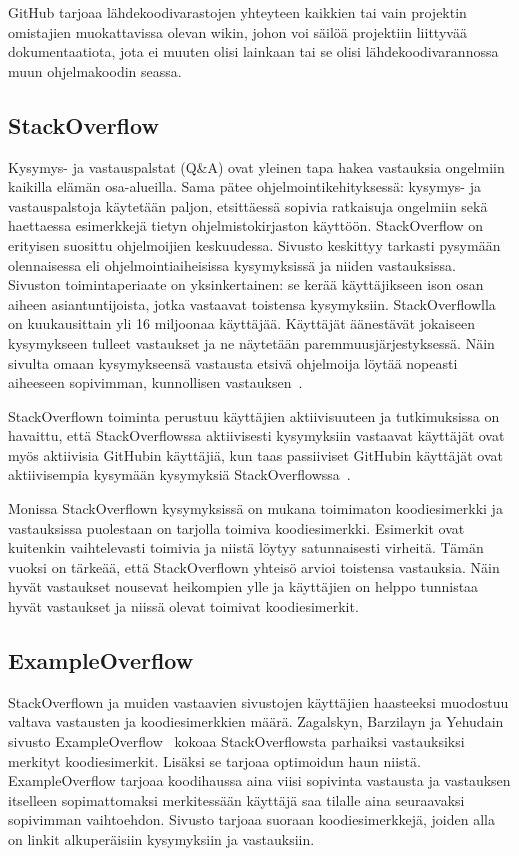 \documentclass[finnish]{tktltiki2}
\theoremstyle{definition}
\theoremstyle{remark}
\begin{document}
GitHub tarjoaa lähdekoodivarastojen yhteyteen kaikkien tai vain projektin omistajien muokattavissa olevan wikin, johon voi säilöä projektiin liittyvää dokumentaatiota, jota ei muuten olisi lainkaan tai se olisi lähdekoodivarannossa muun ohjelmakoodin seassa.

\subsection{StackOverflow}
Kysymys- ja vastauspalstat (Q\&A) ovat yleinen tapa hakea vastauksia ongelmiin kaikilla elämän osa-alueilla. Sama pätee ohjelmointikehityksessä: kysymys- ja vastauspalstoja käytetään paljon, etsittäessä sopivia ratkaisuja ongelmiin sekä haettaessa esimerkkejä tietyn ohjelmistokirjaston käyttöön. StackOverflow on erityisen suosittu ohjelmoijien keskuudessa. Sivusto keskittyy tarkasti pysymään olennaisessa eli ohjelmointiaiheisissa kysymyksissä ja niiden vastauksissa. Sivuston toimintaperiaate on yksinkertainen: se kerää käyttäjikseen ison osan aiheen asiantuntijoista, jotka vastaavat toistensa kysymyksiin. StackOverflowlla on kuukausittain yli 16 miljoonaa käyttäjää. Käyttäjät äänestävät jokaiseen kysymykseen tulleet vastaukset ja ne näytetään paremmuusjärjestyksessä. Näin sivulta omaan kysymykseensä vastausta etsivä ohjelmoija löytää nopeasti aiheeseen sopivimman, kunnollisen vastauksen~\cite{social-networking-meets-se}.

StackOverflown toiminta perustuu käyttäjien aktiivisuuteen ja tutkimuksissa on havaittu, että StackOverflowssa aktiivisesti kysymyksiin vastaavat käyttäjät ovat myös aktiivisia GitHubin käyttäjiä, kun taas passiiviset GitHubin käyttäjät ovat aktiivisempia kysymään kysymyksiä StackOverflowssa~\cite{stackoverflow-and-github}.

Monissa StackOverflown kysymyksissä on mukana toimimaton koodiesimerkki ja  vastauksissa puolestaan on tarjolla toimiva koodiesimerkki. Esimerkit ovat kuitenkin vaihtelevasti toimivia ja niistä löytyy satunnaisesti virheitä. Tämän vuoksi on tärkeää, että StackOverflown yhteisö arvioi toistensa vastauksia. Näin hyvät vastaukset nousevat heikompien ylle ja käyttäjien on helppo tunnistaa hyvät vastaukset ja niissä olevat toimivat koodiesimerkit.

\subsection{ExampleOverflow}
\label{ch:exampleoverflow}

StackOverflown ja muiden vastaavien sivustojen käyttäjien haasteeksi muodostuu valtava vastausten ja koodiesimerkkien määrä. Zagalskyn, Barzilayn ja Yehudain sivusto ExampleOverflow~\cite{example-overflow-social-media-for-code-recommendations} kokoaa StackOverflowsta parhaiksi vastauksiksi merkityt koodiesimerkit. Lisäksi se tarjoaa optimoidun haun niistä. ExampleOverflow tarjoaa koodihaussa aina viisi sopivinta vastausta ja vastauksen itselleen sopimattomaksi merkitessään käyttäjä saa tilalle aina seuraavaksi sopivimman vaihtoehdon. Sivusto tarjoaa suoraan koodiesimerkkejä, joiden alla on linkit alkuperäisiin kysymyksiin ja vastauksiin.
\end{document}
